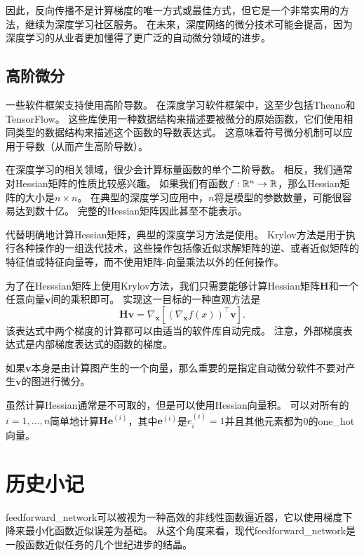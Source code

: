 因此，反向传播不是计算梯度的唯一方式或最佳方式，但它是一个非常实用的方法，继续为深度学习社区服务。 
在未来，深度网络的微分技术可能会提高，因为深度学习的从业者更加懂得了更广泛的自动微分领域的进步。
  
  
\subsection{高阶微分}
\label{sec:higher_order_derivatives}

一些软件框架支持使用高阶导数。 
在深度学习软件框架中，这至少包括Theano和TensorFlow。
这些库使用一种数据结构来描述要被微分的原始函数，它们使用相同类型的数据结构来描述这个函数的导数表达式。
这意味着符号微分机制可以应用于导数（从而产生高阶导数）。

在深度学习的相关领域，很少会计算标量函数的单个二阶导数。
相反，我们通常对Hessian矩阵的性质比较感兴趣。
如果我们有函数$f:\mathbb{R}^n \to \mathbb{R}$，那么Hessian矩阵的大小是$n\times n$。
在典型的深度学习应用中，$n$将是模型的参数数量，可能很容易达到数十亿。
完整的Hessian矩阵因此甚至不能表示。

代替明确地计算Hessian矩阵，典型的深度学习方法是使用。
Krylov方法是用于执行各种操作的一组迭代技术，这些操作包括像近似求解矩阵的逆、或者近似矩阵的特征值或特征向量等，而不使用矩阵-向量乘法以外的任何操作。

为了在Hesssian矩阵上使用Krylov方法，我们只需要能够计算Hessian矩阵$\bm{H}$和一个任意向量$\bm{v}$间的乘积即可。
实现这一目标的一种直观方法\citep{christianson1992automatic}是
\begin{equation}
  \bm{Hv}=\nabla_{\bm{x}} \left [ (\nabla_{\bm{x}} f(x))^\top \bm{v}\right ].
\end{equation}
该表达式中两个梯度的计算都可以由适当的软件库自动完成。
注意，外部梯度表达式是内部梯度表达式的函数的梯度。

如果$\bm{v}$本身是由计算图产生的一个向量，那么重要的是指定自动微分软件不要对产生$\bm{v}$的图进行微分。

虽然计算Hessian通常是不可取的，但是可以使用Hessian向量积。
可以对所有的$i=1,\ldots,n$简单地计算$\bm{He}^{(i)}$，其中$\bm{e}^{(i)}$是$e_i^{(i)}=1$并且其他元素都为0的\gls{one_hot}向量。

\section{历史小记}
\label{sec:historical_notes}

\gls{feedforward_network}可以被视为一种高效的非线性函数逼近器，它以使用梯度下降来最小化函数近似误差为基础。
从这个角度来看，现代\gls{feedforward_network}是一般函数近似任务的几个世纪进步的结晶。
  
